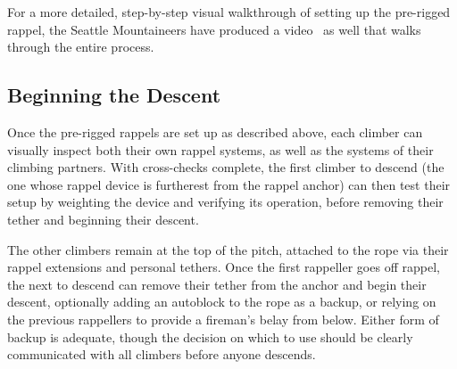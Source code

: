 \documentclass[nonacm,acmtog]{acmart}
\begin{document}
  For a more detailed, step-by-step visual walkthrough of setting up the pre-rigged
  rappel, the Seattle Mountaineers have produced a video~\cite[time
  4:55]{mountaineers:rappel-video} as well that walks through the entire process.

\subsection{Beginning the Descent}

  Once the pre-rigged rappels are set up as described above, each climber can
  visually inspect both their own rappel systems, as well as the systems of
  their climbing partners.  With cross-checks complete, the first climber to
  descend (the one whose rappel device is furtherest from the rappel anchor)
  can then test their setup by weighting the device and verifying its operation,
  before removing their tether and beginning their descent.

  The other climbers remain at the top of the pitch, attached to the rope via
  their rappel extensions and personal tethers.  Once the first rappeller goes
  off rappel, the next to descend can remove their tether from the anchor and
  begin their descent, optionally adding an autoblock to the rope as a backup,
  or relying on the previous rappellers to provide a fireman's belay from
  below.  Either form of backup is adequate, though the decision on which to
  use should be clearly communicated with all climbers before anyone descends.



\end{document}
